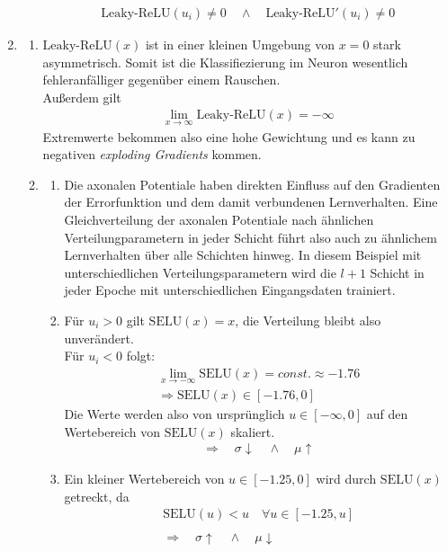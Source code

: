 \documentclass{article}
\newcommand{\leakyrelu}{\text{Leaky-ReLU}}
\newcommand{\selu}{\text{SELU}}
\begin{document}
\begin{enumerate}
\begin{enumerate}[label=\alph*)]
\begin{align*}
\leakyrelu(u_i) \neq 0 \quad \wedge \quad \leakyrelu'(u_i) \neq 0
\end{align*}
\end{enumerate}
\item
\begin{enumerate}[label=\alph*)]
\item $\leakyrelu(x)$ ist in einer kleinen Umgebung von $x=0$ stark asymmetrisch. Somit ist die Klassifiezierung im Neuron wesentlich fehleranfälliger gegenüber einem Rauschen.\\
Außerdem gilt
\begin{align*}
\lim_{x\to \infty} \leakyrelu(x) = -\infty
\end{align*}
Extremwerte bekommen also eine hohe Gewichtung und es kann zu negativen \textit{exploding Gradients} kommen.
\item 
\begin{enumerate}[label=\roman*)]
\item Die axonalen Potentiale haben direkten Einfluss auf den Gradienten der Errorfunktion und dem damit verbundenen Lernverhalten.
Eine Gleichverteilung der axonalen Potentiale nach ähnlichen Verteilungparametern in jeder Schicht führt also auch zu ähnlichem Lernverhalten über alle Schichten hinweg. In diesem Beispiel mit unterschiedlichen Verteilungsparametern wird die $l+1$ Schicht in jeder Epoche mit unterschiedlichen Eingangsdaten trainiert.
\item
Für $u_i>0$ gilt $\selu(x)=x$, die Verteilung bleibt also unverändert.\\
Für $u_i<0$ folgt:
\begin{align*}
\lim_{x\to -\infty} \selu(x) = const. \approx -1.76\\
\Rightarrow \selu(x) \in [-1.76,0] 
\end{align*}
Die Werte werden also von ursprünglich $u\in [-\infty,0]$ auf den Wertebereich von $\selu(x)$ skaliert.
\begin{align*}
\Rightarrow \quad \sigma \downarrow \quad \wedge \quad \mu \uparrow
\end{align*}
\item Ein kleiner Wertebereich von $u \in [-1.25,0]$ wird durch $\selu(x)$ getreckt, da
\begin{align*}
\selu(u)<u \quad \forall u \in [-1.25, u]\\ \\
\Rightarrow \quad \sigma \uparrow \quad \wedge \quad \mu \downarrow
\end{align*}

\end{enumerate}
\end{enumerate}
\end{enumerate}
\end{document}

